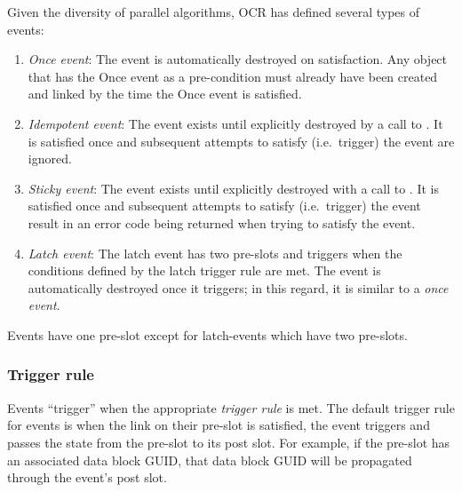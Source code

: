 Given the diversity of parallel algorithms, OCR has defined several
types of events:
\begin{enumerate}
\item \emph{Once event}: The event is automatically
destroyed on satisfaction. Any object that has the Once event as a
pre-condition must already have been created and linked by the time
the Once event is satisfied.

\item \emph{Idempotent event}: The event
exists until explicitly destroyed by a call to
. It is satisfied once and subsequent attempts
to satisfy (i.e.\ trigger) the event are ignored.

\item \emph{Sticky event}: The event exists until
explicitly destroyed with a call to . It is
satisfied once and subsequent attempts to satisfy (i.e.\ trigger) the
event result in an error code being returned when trying to satisfy
the event.
%
%
%
\item \emph{Latch event}: The latch event has two
pre-slots and triggers when the conditions defined by the latch
trigger rule are met. The event is automatically destroyed once it
triggers; in this regard, it is similar to a \emph{once event}.
\end{enumerate}
Events have one pre-slot except for latch-events which have two pre-slots.

\subsubsection{Trigger rule}
\label{sec:triggerrule}
Events ``trigger'' when the appropriate \emph{trigger
rule} is met. The default trigger rule for events
is when the link on their pre-slot is satisfied, the event triggers
and passes the state from the pre-slot to its post slot. For example,
if the pre-slot has an associated data block GUID, that data block
GUID will be propagated through the event's post slot.

